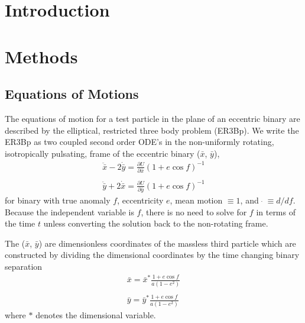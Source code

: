 \documentclass[usenatbib]{mn2e}
\def\xb{\bar{x}}
\def\yb{\bar{y}}
\begin{document}

\section{Introduction}\label{sec:introduction}

\section{Methods}\label{sec:methods}

\subsection{Equations of Motions}
The equations of motion for a test particle in the plane of an
eccentric binary are described by the elliptical, restricted three
body problem (ER3Bp). We write the ER3Bp as two coupled second order
ODE's in the non-uniformly rotating, isotropically pulsating, frame of
the eccentric binary ($\bar{x}$, $\bar{y}$),
\begin{equation}
\begin{array}{c}
\ddot{\xb} - 2\dot{\yb} = \frac{\partial{U}}{\partial{\xb}}  \left( 1 + e \cos{f} \right)^{-1} \nonumber \\ \nonumber \\ 
\ddot{\yb} + 2\dot{\xb} = \frac{\partial{U}}{\partial{\yb}}  \left( 1 + e \cos{f} \right)^{-1}
\label{Eqmotion}
\end{array}
\end{equation}
for binary with true anomaly $f$, eccentricity $e$, mean motion $\equiv 1$,
and $ \ \dot{} \ \equiv d/df$. Because the independent variable is
$f$, there is no need to solve for $f$ in terms of the time $t$ unless
converting the solution back to the non-rotating frame.

The ($\bar{x}$, $\bar{y}$) are dimensionless coordinates of the
massless third particle which are constructed by dividing the
dimensional coordinates by the time changing binary separation
\begin{equation}
\begin{array}{c}
\xb = \xb^* \frac{1 + e \cos{f}}{a ( 1-e^2) } \nonumber \\ \nonumber \\ 
\yb = \yb^* \frac{1 + e \cos{f}}{a ( 1-e^2) } 
\end{array}
\end{equation}
where $*$ denotes the dimensional variable.
\end{document}
